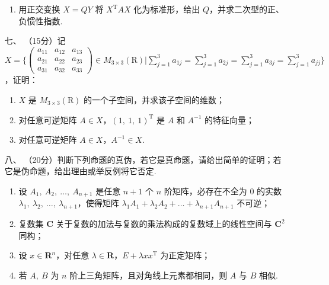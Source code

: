 \begin{enumerate}
\begin{enumerate}[label=(\arabic*)]
        \item 用正交变换 $X=QY$ 将 $X^{\mathrm{T}}AX$ 化为标准形，给出 $Q$，并求二次型的正、负惯性指数.
    \end{enumerate}
	\item[七、]（15分）记 $X=\Bigg\{\begin{pmatrix}a_{11} & a_{12} & a_{13} \\ a_{21} & a_{22} & a_{23} \\ a_{31} & a_{32} & a_{33}\end{pmatrix} \in M_{3 \times 3}(\mathrm{R}) \Bigg| \sum\limits_{j=1}^3a_{1j}=\sum\limits_{j=1}^3a_{2j}=\sum\limits_{j=1}^3a_{3j}=\sum\limits_{j=1}^3a_{jj}\Bigg\}$，证明：
    \begin{enumerate}[label=(\arabic*)]
        \item $X$ 是 $M_{3 \times 3}(\mathrm{R})$ 的一个子空间，并求该子空间的维数；

        \item 对任意可逆矩阵 $A \in X$，$(1,\ 1,\ 1)^{\mathrm{T}}$ 是 $A$ 和 $A^{-1}$ 的特征向量；

        \item 对任意可逆矩阵 $A \in X$，$A^{-1} \in X$.
    \end{enumerate}
	\item[八、]（20分）判断下列命题的真伪，若它是真命题，请给出简单的证明；若它是伪命题，给出理由或举反例将它否定.
    \begin{enumerate}[label=(\arabic*)]
        \item 设 $A_1,\ A_2,\ \dots,\ A_{n+1}$ 是任意 $n+1$ 个 $n$ 阶矩阵，必存在不全为 0 的实数 $\lambda_1,\ \lambda_2,\ \dots,\ \lambda_{n+1}$，使得矩阵 $\lambda_1A_1+\lambda_2A_2+\dots+\lambda_{n+1}A_{n+1}$ 不可逆；

        \item 复数集 $\mathbf{C}$ 关于复数的加法与复数的乘法构成的复数域上的线性空间与 $\mathbf{C}^2$ 同构；

        \item 设 $x \in \mathbf{R}^n$，对任意 $\lambda \in \mathbf{R}$，$E+\lambda xx^{\mathrm{T}}$ 为正定矩阵；

        \item 若 $A,\ B$ 为 $n$ 阶上三角矩阵，且对角线上元素都相同，则 $A$ 与 $ B$ 相似.
    \end{enumerate}
\end{enumerate}

\clearpage

